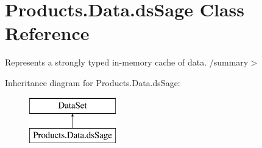 \hypertarget{class_products_1_1_data_1_1ds_sage}{}\section{Products.\+Data.\+ds\+Sage Class Reference}
\label{class_products_1_1_data_1_1ds_sage}


Represents a strongly typed in-\/memory cache of data. /summary$>$  


Inheritance diagram for Products.\+Data.\+ds\+Sage\+:\begin{figure}[H]
\begin{center}
\leavevmode
\includegraphics[height=2.000000cm]{class_products_1_1_data_1_1ds_sage}
\end{center}
\end{figure}
